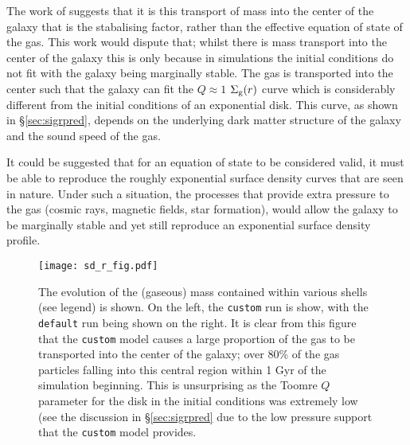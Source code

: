 The work of \citet{krumholz_is_2016} suggests that it is this transport of mass into the center of the galaxy that is the stabalising factor, rather than the effective equation of state of the gas.
This work would dispute that; whilst there is mass transport into the center of the galaxy this is only because in simulations the initial conditions do not fit with the galaxy being marginally stable.
The gas is transported into the center such that the galaxy can fit the $Q\approx1$ $\Sigma_\mathrm{g}(r)$ curve which is considerably different from the initial conditions of an exponential disk.
This curve, as shown in \S \ref{sec:sigrpred}, depends on the underlying dark matter structure of the galaxy and the sound speed of the gas.

It could be suggested that for an equation of state to be considered valid, it must be able to reproduce the roughly exponential surface density curves that are seen in nature.
Under such a situation, the processes that provide extra pressure to the gas (cosmic rays, magnetic fields, star formation), would allow the galaxy to be marginally stable and yet still reproduce an exponential surface density profile.

\begin{figure}[!ht]
    \centering
    \texttt{[image: sd\_r\_fig.pdf]}
    \caption{The evolution of the (gaseous) mass contained within various shells (see legend) is shown. On the left, the {\tt custom} run is show, with the {\tt default} run being shown on the right. It is clear from this figure that the {\tt custom} model causes a large proportion of the gas to be transported into the center of the galaxy; over 80\% of the gas particles falling into this central region within 1 Gyr of the simulation beginning. This is unsurprising as the Toomre $Q$ parameter for the disk in the initial conditions was extremely low (see the discussion in \S \ref{sec:sigrpred} due to the low pressure support that the {\tt custom} model provides.}
    \label{fig:sd_r_evo}
\end{figure}

